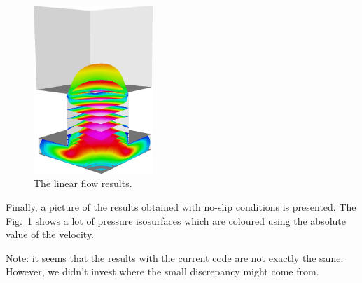 \begin{figure}[htb]
  \centerline{\includegraphics[width=0.40\textwidth]{flow_res}}
  \caption{The linear flow results.} 
  \label{fig:flow_res}
\end{figure}
Finally, a picture of the results obtained with no-slip conditions is
presented. The Fig.~\ref{fig:flow_res} shows a lot of pressure
isosurfaces which are coloured using the absolute value of the
velocity.

Note: it seems that the results with the current code are not
exactly the same. However, we didn't invest where the small discrepancy
might come from. 


\vfill
\mbox{}
